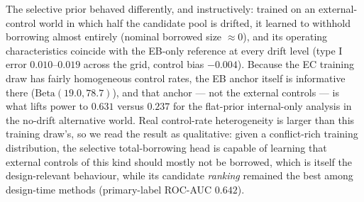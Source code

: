 \documentclass[11pt]{article}
\begin{document}
The selective prior behaved differently, and instructively: trained on an
external-control world in which half the candidate pool is drifted, it learned
to withhold borrowing almost entirely (nominal borrowed size $\approx 0$), and
its operating characteristics coincide with the EB-only reference at every
drift level (type I error $0.010$--$0.019$ across the grid, control bias
$-0.004$). Because the EC training draw has fairly homogeneous control rates,
the EB anchor itself is informative there ($\mathrm{Beta}(19.0, 78.7)$), and
that anchor --- not the external controls --- is what lifts power to $0.631$
versus $0.237$ for the flat-prior internal-only analysis in the
no-drift alternative world. Real control-rate heterogeneity is larger than
this training draw's, so we read the result as qualitative: given a
conflict-rich training distribution, the selective total-borrowing head is
capable of learning that external controls of this kind should mostly not be
borrowed, which is itself the design-relevant behaviour, while its candidate
\emph{ranking} remained the best among design-time methods (primary-label
ROC-AUC $0.642$).
\end{document}
